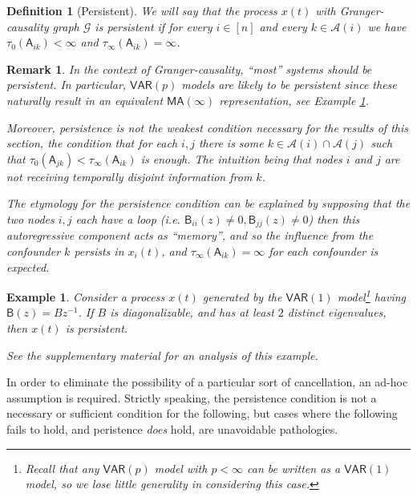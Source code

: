 \documentclass{statsoc}
\def\gcg{\mathcal{G}}  %
\def\VAR{\mathsf{VAR}}  %
\def\B{\mathsf{B}}  %
\def\A{\mathsf{A}}  %
\newcommand{\anc}[1]{\mathcal{A}(#1)}  %
\newtheorem{remark}{Remark}
\newtheorem{definition}{Definition}
\newtheorem{example}{Example}
\begin{document}
\begin{definition}[Persistent]
  We will say that the process $x(t)$ with Granger-causality graph
  $\gcg$ is \textit{persistent} if for every $i \in [n]$ and every
  $k \in \anc{i}$ we have $\tau_0(\A_{ik}) < \infty$ and $\tau_\infty(\A_{ik}) = \infty$.
\end{definition}

\begin{remark}
  In the context of Granger-causality, ``most'' systems should be
  persistent.  In particular, $\mathsf{\VAR}(p)$ models are likely to
  be persistent since these naturally result in an equivalent
  $\mathsf{MA}(\infty)$ representation, see Example
  \ref{ex:persistent_system}.

  Moreover, persistence is not the weakest condition necessary for the
  results of this section, the condition that for each $i, j$ there is
  some $k \in \anc{i}\cap\anc{j}$ such that
  $\tau_0(\A_{jk}) < \tau_\infty(\A_{ik})$ is enough.  The intuition
  being that nodes $i$ and $j$ are not receiving temporally disjoint
  information from $k$.

  The etymology for the persistence condition can be explained by
  supposing that the two nodes $i, j$ each have a loop (i.e.
  $\B_{ii}(z) \ne 0, \B_{jj}(z) \ne 0$) then this autoregressive
  component acts as ``memory'', and so the influence from the
  confounder $k$ \textit{persists} in $x_i(t)$, and
  $\tau_\infty(\A_{ik}) = \infty$ for each confounder is expected.
\end{remark}

\begin{example}
  \label{ex:persistent_system}
  Consider a process $x(t)$ generated by the $\VAR(1)$
  model\footnote{Recall that any $\VAR(p)$ model with $p < \infty$ can
    be written as a $\VAR(1)$ model, so we lose little generality in
    considering this case.}  having $\B(z) = Bz^{-1}$.  If $B$ is
  diagonalizable, and has at least $2$ distinct eigenvalues, then
  $x(t)$ is persistent.

  See the supplementary material for an analysis of this example.
\end{example}

In order to eliminate the possibility of a particular sort of
cancellation, an ad-hoc assumption is required.  Strictly speaking,
the persistence condition is not a necessary or sufficient condition
for the following, but cases where the following fails to hold, and
peristence \textit{does} hold, are unavoidable pathologies.
\end{document}
